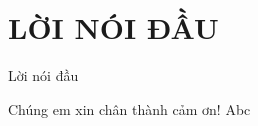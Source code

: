 \section*{LỜI NÓI ĐẦU} %
\thispagestyle{empty}

Lời nói đầu

Chúng em xin chân thành cảm ơn! Abc



\cleardoublepage
